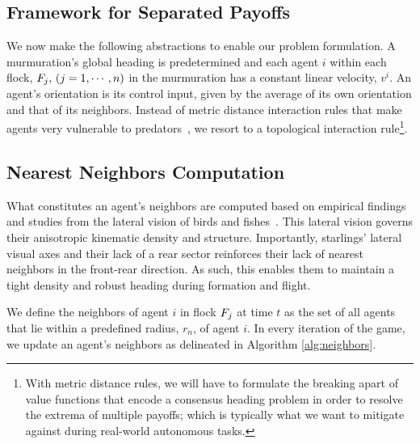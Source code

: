 \subsection{Framework for Separated Payoffs}
%
We now make the following abstractions to enable our problem formulation.
%
A murmuration's global heading is predetermined and each agent $i$ within each flock, $F_j,\, (j=1, \cdots, n)$ in the murmuration has a constant linear velocity, $v^i$. An agent's orientation is its control input, given by the average of its own orientation and that of its neighbors. Instead of metric distance interaction rules that make agents very vulnerable to predators~\cite{Ballerini1232}, we resort to a topological interaction rule\footnote{With metric distance rules, we will have to formulate the breaking apart of value functions that encode a consensus heading problem in order to resolve the extrema of multiple payoffs; which is typically what we want to mitigate against during real-world autonomous tasks.}. 


\subsection{Nearest Neighbors Computation}
%
What constitutes an agent's neighbors are computed based on empirical findings and studies from the lateral vision of birds and fishes~\cite{Ballerini1232, JadbabaieCoord, Helbing20}. This lateral vision governs their anisotropic kinematic density and structure. Importantly, starlings' lateral visual axes and their lack of a rear sector reinforces their lack of nearest neighbors in the front-rear direction. As such, this enables them to maintain a tight density and robust heading during formation and flight.

\begin{definition}
	We define the neighbors of agent $i$ in flock $F_j$ at time $t$ as the set of all agents that lie within a predefined radius, $r_n$, of agent $i$. In every iteration of the game, we update an agent's neighbors as delineated in Algorithm \ref{alg:neighbors}.
\end{definition}
%



